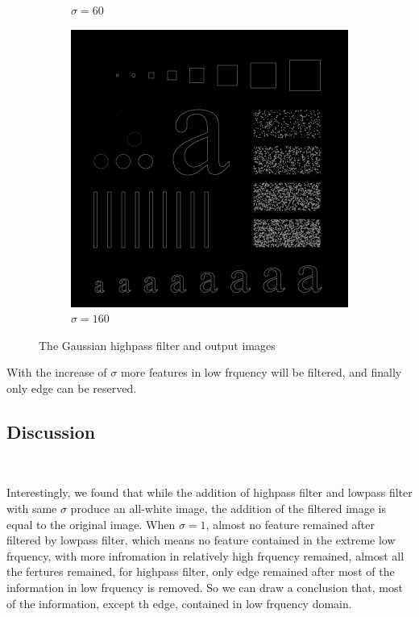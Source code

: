 \documentclass[
	12pt, %
]{style/fphw}
\begin{document}
\begin{figure}[H]
\begin{subfigure}[b]{.3\textwidth}
         \caption{$\sigma=60$}
         \label{Q5_2_highpass_60}
     \end{subfigure}
     \hfill
     \begin{subfigure}[b]{.3\textwidth}
         \centering
         \includegraphics[width=\textwidth]{plots2/Q5_2_highpass_160.png}
         \caption{$\sigma=160$}
         \label{Q5_2_highpass_160}
     \end{subfigure}
     
    \caption{The Gaussian highpass filter and output images}
    \label{Gaussian highpass filter}
\end{figure}

With the increase of $\sigma$ more features in low frquency will be filtered, and finally only edge can be reserved.

\subsection*{Discussion} \

Interestingly, we found that while the addition of highpass filter and lowpass filter with same $\sigma$ produce an all-white image, the addition of the filtered image is equal to the original image. When $\sigma=1$, almost no feature remained after filtered by lowpass filter, which means no feature contained in the extreme low frquency, with more infromation in relatively high frquency remained, almost all the fertures remained, for highpass filter, only edge remained after most of the information in low frquency is removed. So we can draw a conclusion that, most of the information, except th edge, contained in low frquency domain.
\end{document}
